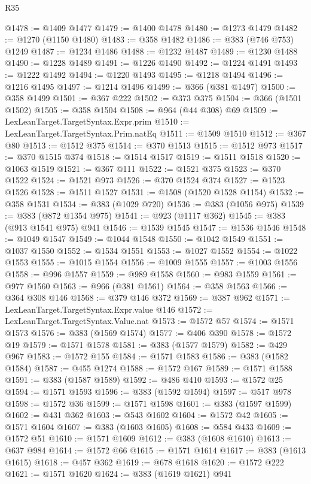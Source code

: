 \begin{lexlean}{R35}
\begin{coremodule}
@1478 := @1409 @1477
@1479 := @1400 @1478
@1480 := @1273 @1479
@1482 := @1270 (@1150 @1480)
@1483 := @358 @1482
@1486 := @383 (@746 @753) @1249
@1487 := @1234 @1486
@1488 := @1232 @1487
@1489 := @1230 @1488
@1490 := @1228 @1489
@1491 := @1226 @1490
@1492 := @1224 @1491
@1493 := @1222 @1492
@1494 := @1220 @1493
@1495 := @1218 @1494
@1496 := @1216 @1495
@1497 := @1214 @1496
@1499 := @366 (@381 @1497)
@1500 := @358 @1499
@1501 := @367 @222
@1502 := @373 @375
@1504 := @366 (@1501 @1502)
@1505 := @358 @1504
@1508 := @964 (@44 @308) @69
@1509 := LexLeanTarget.TargetSyntax.Expr.prim
@1510 := LexLeanTarget.TargetSyntax.Prim.natEq
@1511 := @1509 @1510
@1512 := @367 @80
@1513 := @1512 @375
@1514 := @370 @1513
@1515 := @1512 @973
@1517 := @370 @1515 @374
@1518 := @1514 @1517
@1519 := @1511 @1518
@1520 := @1063 @1519
@1521 := @367 @111
@1522 := @1521 @375
@1523 := @370 @1522
@1524 := @1521 @973
@1526 := @370 @1524 @374
@1527 := @1523 @1526
@1528 := @1511 @1527
@1531 := @1508 (@1520 @1528 @1154)
@1532 := @358 @1531
@1534 := @383 (@1029 @720)
@1536 := @383 (@1056 @975)
@1539 := @383 (@872 @1354 @975)
@1541 := @923 (@1117 @362)
@1545 := @383 (@913 @1541 @975) @941
@1546 := @1539 @1545
@1547 := @1536 @1546
@1548 := @1049 @1547
@1549 := @1044 @1548
@1550 := @1042 @1549
@1551 := @1037 @1550
@1552 := @1534 @1551
@1553 := @1027 @1552
@1554 := @1022 @1553
@1555 := @1015 @1554
@1556 := @1009 @1555
@1557 := @1003 @1556
@1558 := @996 @1557
@1559 := @989 @1558
@1560 := @983 @1559
@1561 := @977 @1560
@1563 := @966 (@381 @1561)
@1564 := @358 @1563
@1566 := @364 @308 @146
@1568 := @379 @146 @372
@1569 := @387 @962
@1571 := LexLeanTarget.TargetSyntax.Expr.value @146
@1572 := LexLeanTarget.TargetSyntax.Value.nat
@1573 := @1572 @57
@1574 := @1571 @1573
@1576 := @383 (@1569 @1574)
@1577 := @406 @390
@1578 := @1572 @19
@1579 := @1571 @1578
@1581 := @383 (@1577 @1579)
@1582 := @429 @967
@1583 := @1572 @155
@1584 := @1571 @1583
@1586 := @383 (@1582 @1584)
@1587 := @455 @1274
@1588 := @1572 @167
@1589 := @1571 @1588
@1591 := @383 (@1587 @1589)
@1592 := @486 @410
@1593 := @1572 @25
@1594 := @1571 @1593
@1596 := @383 (@1592 @1594)
@1597 := @517 @978
@1598 := @1572 @36
@1599 := @1571 @1598
@1601 := @383 (@1597 @1599)
@1602 := @431 @362
@1603 := @543 @1602
@1604 := @1572 @42
@1605 := @1571 @1604
@1607 := @383 (@1603 @1605)
@1608 := @584 @433
@1609 := @1572 @51
@1610 := @1571 @1609
@1612 := @383 (@1608 @1610)
@1613 := @637 @984
@1614 := @1572 @66
@1615 := @1571 @1614
@1617 := @383 (@1613 @1615)
@1618 := @457 @362
@1619 := @678 @1618
@1620 := @1572 @222
@1621 := @1571 @1620
@1624 := @383 (@1619 @1621) @941

\end{coremodule}
\end{lexlean}
